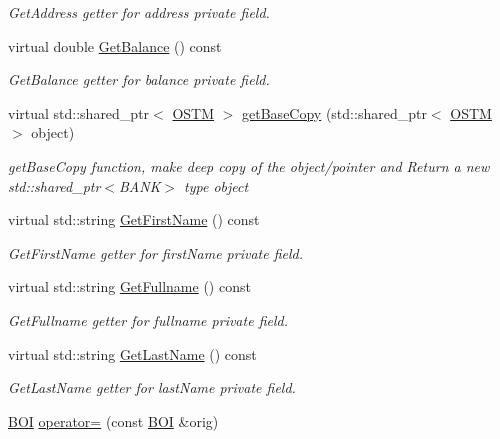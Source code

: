 \begin{DoxyCompactItemize}
\begin{DoxyCompactList}\small\item\em Get\+Address getter for address private field. \end{DoxyCompactList}\item 
virtual double \hyperlink{class_b_o_i_a25b289dece2a1685bb9d1a9332c9be0b_a25b289dece2a1685bb9d1a9332c9be0b}{Get\+Balance} () const 
\begin{DoxyCompactList}\small\item\em Get\+Balance getter for balance private field. \end{DoxyCompactList}\item 
virtual std\+::shared\+\_\+ptr$<$ \hyperlink{class_o_s_t_m}{O\+S\+TM} $>$ \hyperlink{class_b_o_i_ad53ae2918a656793b9d7a670d35ecfa3_ad53ae2918a656793b9d7a670d35ecfa3}{get\+Base\+Copy} (std\+::shared\+\_\+ptr$<$ \hyperlink{class_o_s_t_m}{O\+S\+TM} $>$ object)
\begin{DoxyCompactList}\small\item\em get\+Base\+Copy function, make deep copy of the object/pointer and Return a new std\+::shared\+\_\+ptr$<$\+B\+A\+N\+K$>$ type object \end{DoxyCompactList}\item 
virtual std\+::string \hyperlink{class_b_o_i_ab4b9d50c6008a666aa4382def580e7d1_ab4b9d50c6008a666aa4382def580e7d1}{Get\+First\+Name} () const 
\begin{DoxyCompactList}\small\item\em Get\+First\+Name getter for first\+Name private field. \end{DoxyCompactList}\item 
virtual std\+::string \hyperlink{class_b_o_i_af56446a377068cd65526e40e8b31b878_af56446a377068cd65526e40e8b31b878}{Get\+Fullname} () const 
\begin{DoxyCompactList}\small\item\em Get\+Fullname getter for fullname private field. \end{DoxyCompactList}\item 
virtual std\+::string \hyperlink{class_b_o_i_a37828f3fa4a32f522966e2cad90eaab2_a37828f3fa4a32f522966e2cad90eaab2}{Get\+Last\+Name} () const 
\begin{DoxyCompactList}\small\item\em Get\+Last\+Name getter for last\+Name private field. \end{DoxyCompactList}\item 
\hyperlink{class_b_o_i}{B\+OI} \hyperlink{class_b_o_i_a4b4a3976cc13c4d3de0d7ff8882a7af3_a4b4a3976cc13c4d3de0d7ff8882a7af3}{operator=} (const \hyperlink{class_b_o_i}{B\+OI} \&orig)

\end{DoxyCompactItemize}
